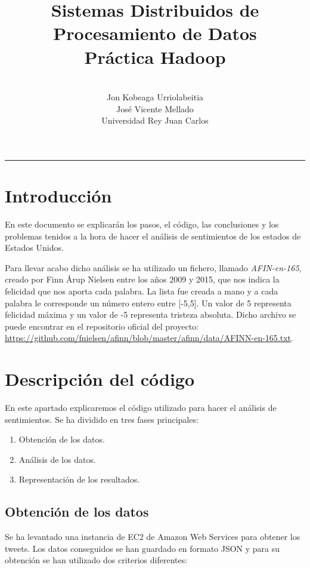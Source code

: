 \documentclass[12pt,a4paper]{article}
\title{Sistemas Distribuidos de Procesamiento de Datos\\Práctica Hadoop}
\author{\\Jon Kobeaga Urriolabeitia\\ José Vicente Mellado \\Universidad Rey Juan Carlos}
\begin{document}
\maketitle
\hrule
\tableofcontents
\newpage
\section{Introducción}
En este documento se explicarán los pasos, el código, las conclusiones y los problemas tenidos a la hora de hacer el análisis de sentimientos de los estados de Estados Unidos. 

Para llevar acabo dicho análisis se ha utilizado un fichero, llamado \textit{AFIN-en-165}, creado por Finn Årup Nielsen entre los años 2009 y 2015, que nos indica la felicidad que nos aporta cada palabra. La lista fue creada a mano y a cada palabra le corresponde un número entero entre [-5,5]. Un valor de 5 representa felicidad máxima y un valor de -5 representa tristeza absoluta.
Dicho archivo se puede encontrar en el repositorio oficial del proyecto: \url{https://github.com/fnielsen/afinn/blob/master/afinn/data/AFINN-en-165.txt}.


\section{Descripción del código}

En este apartado explicaremos el código utilizado para hacer el análisis de sentimientos. Se ha dividido en tres fases principales:

\begin{enumerate}
\item Obtención de los datos.
\item Análisis de los datos.
\item Representación de los resultados.
\end{enumerate}

\subsection{Obtención de los datos}
Se ha levantado una instancia de EC2 de Amazon Web Services para obtener los tweets. Los datos conseguidos se han guardado en formato JSON y para su obtención se han utilizado dos criterios diferentes:
\end{document}
